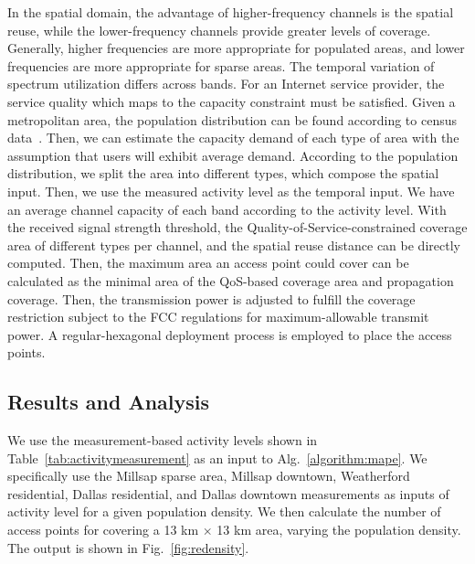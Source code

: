 In the spatial domain, the advantage of higher-frequency channels is the spatial reuse, while the lower-frequency 
channels provide greater levels of coverage. Generally, higher frequencies are more appropriate for populated 
areas, and lower frequencies are more appropriate for sparse areas. The temporal variation of spectrum utilization 
differs across bands. For an Internet service provider, the service quality which maps to the capacity constraint 
must be satisfied. Given a metropolitan area, the population distribution can be found according to census data~\cite{uscensus}. 
Then, we can estimate the capacity demand of each type of area with the assumption that users 
will exhibit average demand. According to the population distribution, we split the area into different types,
which compose the spatial input. Then, we use the measured activity level as the temporal input. We have an average 
channel capacity of each band according to the activity level. With the received signal strength threshold, the 
Quality-of-Service-constrained coverage area of different types per channel, and the spatial reuse distance can be 
directly computed. Then, the maximum area an access point could cover can be calculated as the minimal area of the 
QoS-based coverage area and propagation coverage. Then, the transmission power is adjusted to fulfill the coverage 
restriction subject to the FCC regulations for maximum-allowable transmit power. A regular-hexagonal deployment 
process is employed to place the access points. 

\subsection{Results and Analysis}
\label{subsec:winmeeresult}

We use the measurement-based activity levels shown in Table~\ref{tab:activitymeasurement} as an input to 
Alg.~\ref{algorithm:mape}. We specifically use the Millsap sparse area, Millsap downtown, Weatherford residential, 
Dallas residential, and Dallas downtown measurements as inputs of activity level for a given population density. We then 
calculate the number of access points for covering a 13 km $\times$ 13 km area, varying the population density. The 
output is shown in Fig.~\ref{fig:redensity}. 

